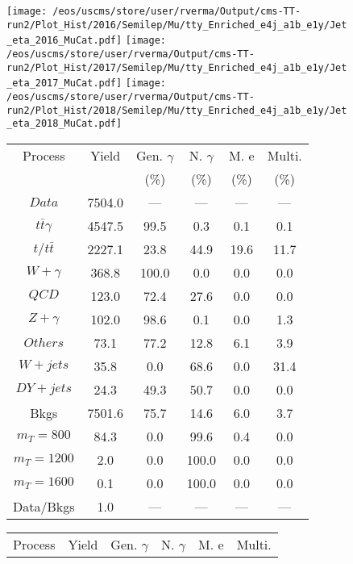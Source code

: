 \begin{figure}
\centering
\texttt{[image: /eos/uscms/store/user/rverma/Output/cms-TT-run2/Plot\_Hist/2016/Semilep/Mu/tty\_Enriched\_e4j\_a1b\_e1y/Jet\_eta\_2016\_MuCat.pdf]}
\texttt{[image: /eos/uscms/store/user/rverma/Output/cms-TT-run2/Plot\_Hist/2017/Semilep/Mu/tty\_Enriched\_e4j\_a1b\_e1y/Jet\_eta\_2017\_MuCat.pdf]}
\texttt{[image: /eos/uscms/store/user/rverma/Output/cms-TT-run2/Plot\_Hist/2018/Semilep/Mu/tty\_Enriched\_e4j\_a1b\_e1y/Jet\_eta\_2018\_MuCat.pdf]}
\begin{minipage}[c]{0.32\textwidth}
\centering
\tiny{
\begin{tabular}{cccccc}
\hline
Process & Yield & Gen. $\gamma$ & N. $\gamma$ & M. e & Multi. \\
 &  & (\%) & (\%) & (\%) & (\%)  \\
\hline
                                                                      $ Data $ &  7504.0 &  --- &  --- &  --- &  ---\\
$ t\bar{t}\gamma $ &  4547.5 &  99.5 &  0.3 &  0.1 &  0.1\\
$ t/t\bar{t} $ &  2227.1 &  23.8 &  44.9 &  19.6 &  11.7\\
$ W+\gamma $ &  368.8 &  100.0 &  0.0 &  0.0 &  0.0\\
$ QCD $ &  123.0 &  72.4 &  27.6 &  0.0 &  0.0\\
$ Z+\gamma $ &  102.0 &  98.6 &  0.1 &  0.0 &  1.3\\
$ Others $ &  73.1 &  77.2 &  12.8 &  6.1 &  3.9\\
$ W+jets $ &  35.8 &  0.0 &  68.6 &  0.0 &  31.4\\
$ DY+jets $ &  24.3 &  49.3 &  50.7 &  0.0 &  0.0\\
Bkgs &  7501.6 &  75.7 &  14.6 &  6.0 &  3.7\\
$ m_{T} = 800 $ &  84.3 &  0.0 &  99.6 &  0.4 &  0.0\\
$ m_{T} = 1200 $ &  2.0 &  0.0 &  100.0 &  0.0 &  0.0\\
$ m_{T} = 1600 $ &  0.1 &  0.0 &  100.0 &  0.0 &  0.0\\
Data/Bkgs &  1.0 &  --- &  --- &  --- &  ---\\
\hline
\end{tabular}
}
\end{minipage}
\begin{minipage}[c]{0.32\textwidth}
\centering
\tiny{
\begin{tabular}{cccccc}
\hline
Process & Yield & Gen. $\gamma$ & N. $\gamma$ & M. e & Multi. \\

\end{tabular}}
\end{minipage}
\end{figure}
